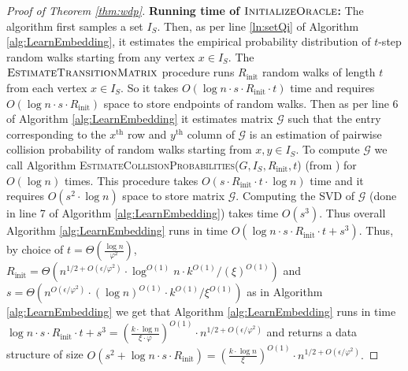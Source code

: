 \documentclass[letterpaper,11pt]{article}
\newcommand{\G}{\mathcal{G}}
\theoremstyle{plain}
\theoremstyle{definition}
\theoremstyle{remark}
\begin{document}
\begin{proof}[Proof of Theorem \ref{thm:wdp}]
\textbf{Running time of $\textsc{InitializeOracle}$:}
The algorithm first samples a 
set $I_S$. Then, as per line \ref{ln:setQi} of Algorithm \ref{alg:LearnEmbedding}, it 
estimates the empirical probability distribution of $t$-step random walks starting from 
any vertex $x\in I_S$. The $\textsc{EstimateTransitionMatrix}$ procedure runs $R_{\text{init}}$ random walks of length  $t$ from each vertex $x\in I_S$. So it takes $O(\log n\cdot s\cdot R_{\text{init}} \cdot t)$ time 
and requires $O(\log n\cdot s\cdot R_{\text{init}})$ space to store endpoints of random walks. Then as per line 6 of Algorithm \ref{alg:LearnEmbedding} it estimates matrix $\G$ such that 
the entry corresponding to the $x^\text{th}$ row and $y^{\text{th}}$ column of $\G$ is an 
estimation of pairwise collision probability of random walks starting from $x,y \in I_S$. To 
compute $\G$ we call Algorithm \textsc{EstimateCollisionProbabilities}($G,I_S,R_{\text{init}},t$) 
(from \cite{GluchKLMS21}) for $O(\log n)$ times. This procedure takes 
$O(s\cdot R_{\text{init}}\cdot t \cdot \log n)$ time and it requires $O(s^2\cdot \log n)$ space to 
store matrix $\G$. Computing the SVD of $\G$ (done in line 7 of Algorithm \ref{alg:LearnEmbedding}) 
takes time $O(s^3)$. Thus overall Algorithm \ref{alg:LearnEmbedding} runs in 
time $O \left(\log n\cdot s\cdot R_{\text{init}} \cdot t+ s^3\right)$. Thus, by choice of 
$t= \varTheta\left(\frac{\log n}{\varphi^2}\right)$, 
$R_{\text{init}}=\varTheta{(n^{1/2+ O(\epsilon / \varphi^2)}  \cdot \log^{O(1)} n \cdot k^{O(1)}/(\xi)^{O(1)})}$ 
and $s= \varTheta(n^{O(\epsilon / \varphi^2)}\cdot (\log n)^{O(1)} \cdot k^{O(1)}/{\xi}^{O(1)})$  as in 
Algorithm \ref{alg:LearnEmbedding} we get that Algorithm \ref{alg:LearnEmbedding} runs in time 
$\log n\cdot s\cdot R_{\text{init}} \cdot t+ s^3=(\frac{k\cdot \log n}{\xi\cdot \varphi})^{O(1)}\cdot n^{1/2+O(\epsilon/\varphi^2)}$ 
and returns a data structure of size 
$O \left(s^2+\log n\cdot s \cdot R_{\text{init}}\right)=(\frac{k\cdot \log n}{\xi})^{O(1)}\cdot n^{1/2+O(\epsilon/\varphi^2)}\text{.}$



\end{proof}
\end{document}
